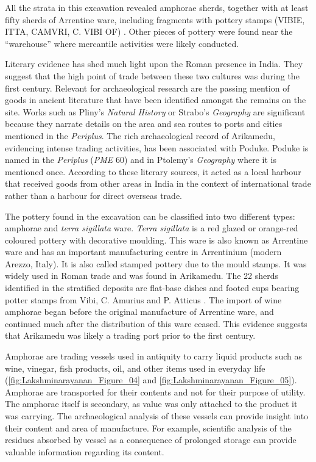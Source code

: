 All the strata in this excavation revealed amphorae sherds, together with at least fifty sherds of Arrentine ware, including fragments with pottery stamps (VIBIE, ITTA, CAMVRI, C. VIBI OF) \parencite[][177]{wheeler1955}. Other pieces of pottery were found near the “warehouse” where mercantile activities were likely conducted.


Literary evidence has shed much light upon the Roman presence in India. They suggest that the high point of trade between these two cultures was during the first century\AD. Relevant for archaeological research are the passing mention of goods in ancient literature that have been identified amongst the remains on the site. Works such as Pliny’s \emph{Natural History} or Strabo’s \emph{Geography} are significant because they narrate details on the area and sea routes to ports and cities mentioned in the \emph{Periplus}. The rich archaeological record of Arikamedu, evidencing intense trading activities, has been associated with Poduke. Poduke is named in the \emph{Periplus} (\emph{PME} 60) and in Ptolemy’s \emph{Geography} where it is mentioned once. According to these literary sources, it acted as a local harbour that received goods from other areas in India in the context of international trade rather than a harbour for direct overseas trade.

The pottery found in the excavation can be classified into two different types: amphorae and \emph{terra sigillata} ware. \emph{Terra sigillata} is a red glazed or orange-red coloured pottery with decorative moulding. This ware is also known as Arrentine ware and has an important manufacturing centre in Arrentinium (modern Arezzo, Italy). It is also called stamped pottery due to the mould stamps. It was widely used in Roman trade and was found in Arikamedu. The 22 sherds identified in the stratified deposits are flat-base dishes and footed cups bearing potter stamps from Vibi, C. Amurius and P. Atticus \parencite[][21]{wheeler1946}. The import of wine amphorae began before the original manufacture of Arrentine ware, and continued much after the distribution of this ware ceased. This evidence suggests that Arikamedu was likely a trading port prior to the first century.

Amphorae are trading vessels used in antiquity to carry liquid products such as wine, vinegar, fish products, oil, and other items used in everyday life (\cref{fig:Lakshminarayanan_Figure_04} and \cref{fig:Lakshminarayanan_Figure_05}). Amphorae are transported for their contents and not for their purpose of utility. The amphorae itself is secondary, as value was only attached to the product it was carrying. The archaeological analysis of these vessels can provide insight into their content and area of manufacture. For example, scientific analysis of the residues absorbed by vessel as a consequence of prolonged storage can provide valuable information regarding its content.

